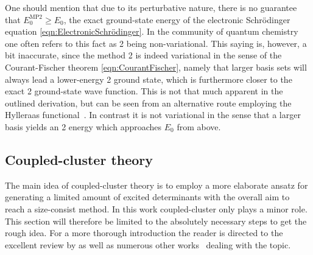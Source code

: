 One should mention that due to its perturbative nature,
there is no guarantee that $E_0^\text{MP2} \geq E_0$,
the exact ground-state energy of the electronic Schrödinger equation \eqref{eqn:ElectronicSchrödinger}.
In the community of quantum chemistry one often refers
to this fact as {\MP}2 being non-variational.
This saying is, however, a bit inaccurate,
since the method {\MP}2 is indeed variational
in the sense of the Courant-Fischer theorem \eqref{eqn:CourantFischer},
namely that larger basis sets will always lead a lower-energy {\MP}2 ground state,
which is furthermore closer to the exact {\MP}2 ground-state wave function.
This is not that much apparent in the outlined derivation,
but can be seen from an alternative route
employing the Hylleraas functional~\cite{Helgaker2013}.
In contrast it is not variational in the sense that
a larger basis yields an {\MP}2 energy
which approaches $E_0$ from above.

\subsection{Coupled-cluster theory}
\defineabbr{CC}{CC\xspace}{Coupled cluster}
\label{sec:CC}

The main idea of coupled-cluster theory
is to employ a more elaborate ansatz for generating a limited amount
of excited determinants with the overall aim to
reach a size-consist method.
In this work coupled-cluster only plays a minor role.
This section will therefore be limited to the absolutely necessary
steps to get the rough idea.
For a more thorough introduction the reader is directed
to the excellent review by \citet{Crawford2007}
as well as numerous other works~\cite{Helgaker2013,Hodecker2016}
dealing with the topic.


